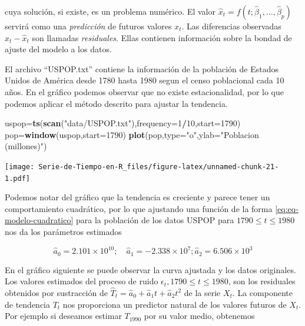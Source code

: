 \documentclass[12pt,]{krantz}
\makeatletter
\newenvironment{Shaded}{\begin{snugshade}}{\end{snugshade}}
\newcommand{\KeywordTok}[1]{\textcolor[rgb]{0.13,0.29,0.53}{\textbf{#1}}}
\newcommand{\DataTypeTok}[1]{\textcolor[rgb]{0.13,0.29,0.53}{#1}}
\newcommand{\DecValTok}[1]{\textcolor[rgb]{0.00,0.00,0.81}{#1}}
\newcommand{\StringTok}[1]{\textcolor[rgb]{0.31,0.60,0.02}{#1}}
\newcommand{\OperatorTok}[1]{\textcolor[rgb]{0.81,0.36,0.00}{\textbf{#1}}}
\newcommand{\NormalTok}[1]{#1}
\newenvironment{kframe}{%
\medskip{}
\setlength{\fboxsep}{.8em}
 \def\at@end@of@kframe{}%
 \ifinner\ifhmode%
  \def\at@end@of@kframe{\end{minipage}}%
  \begin{minipage}{\columnwidth}%
 \fi\fi%
 \def\FrameCommand##1{\hskip\@totalleftmargin \hskip-\fboxsep
 \colorbox{shadecolor}{##1}\hskip-\fboxsep
     \hskip-\linewidth \hskip-\@totalleftmargin \hskip\columnwidth}%
 \MakeFramed {\advance\hsize-\width
   \@totalleftmargin\z@ \linewidth\hsize
   \@setminipage}}%
 {\par\unskip\endMakeFramed%
 \at@end@of@kframe}
\renewenvironment{Shaded}{\begin{kframe}}{\end{kframe}}
\theoremstyle{definition}
\theoremstyle{definition}
\theoremstyle{definition}
\theoremstyle{remark}
\let\BeginKnitrBlock\begin \let\EndKnitrBlock\end
\makeatother
\begin{document}
cuya solución, si existe, es un problema numérico. El valor
\(\hat{x}_t=f(t;\hat{\beta}_1,\ldots,\hat{\beta}_p)\) servirá como una
\emph{predicción} de futuros valores \(x_t\). Las diferencias observadas
\(x_t-\hat{x}_t\) son llamadas \emph{residuales}. Ellas contienen
información sobre la bondad de ajuste del modelo a los datos.

\BeginKnitrBlock{example}
\protect\hypertarget{exm:ejem-poblacion-usa-metodo-T1}{}{\label{exm:ejem-poblacion-usa-metodo-T1}
}El archivo ``USPOP.txt'' contiene la información de la población de
Estados Unidos de América desde 1780 hasta 1980 segun el censo
poblacional cada 10 años. En el gráfico podemos observar que no existe
estacionalidad, por lo que podemos aplicar el método descrito para
ajustar la tendencia.
\EndKnitrBlock{example}

\begin{Shaded}
\begin{Highlighting}[]
\NormalTok{uspop=}\KeywordTok{ts}\NormalTok{(}\KeywordTok{scan}\NormalTok{(}\StringTok{"data/USPOP.txt"}\NormalTok{),}\DataTypeTok{frequency=}\DecValTok{1}\OperatorTok{/}\DecValTok{10}\NormalTok{,}\DataTypeTok{start=}\DecValTok{1790}\NormalTok{) }
\NormalTok{pop=}\KeywordTok{window}\NormalTok{(uspop,}\DataTypeTok{start=}\DecValTok{1790}\NormalTok{)}
\KeywordTok{plot}\NormalTok{(pop,}\DataTypeTok{type=}\StringTok{"o"}\NormalTok{,}\DataTypeTok{ylab=}\StringTok{"Poblacion (millones)"}\NormalTok{)}
\end{Highlighting}
\end{Shaded}

\texttt{[image: Serie-de-Tiempo-en-R\_files/figure-latex/unnamed-chunk-21-1.pdf]}

Podemos notar del gráfico que la tendencia es creciente y parece tener
un comportamiento cuadrático, por lo que ajustando una función de la
forma \eqref{eq:eq-modelo-cuadratico} para la población de los datos USPOP
para \(1790\leq t\leq1980\) nos da los parámetros estimados

\[\hat{a}_0=2.101\times10^{10};\quad \hat{a}_1=-2.338\times10^{7}; \hat{a}_2=6.506\times10^{3}\]

En el gráfico siguiente se puede observar la curva ajustada y los datos
originales. Los valores estimados del proceso de ruido
\(\epsilon_t, 1790\leq t\leq1980\), son los residuales obtenidos por
sustracción de \(\hat{T}_t=\hat{a}_0+\hat{a}_1t+\hat{a}_2t^2\) de la
serie \(X_t\). La componente de tendencia \(T_t\) nos proporciona un
predictor natural de los valores futuros de \(X_t\). Por ejemplo si
deseamos estimar \(T_{1990}\) por su valor medio, obtenemos
\end{document}
